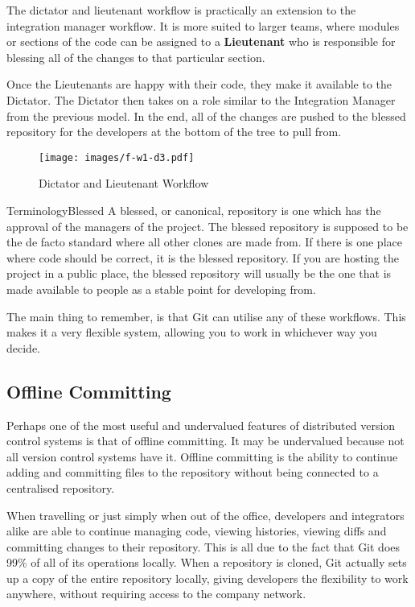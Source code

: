 The dictator and lieutenant workflow is practically an extension to the integration manager workflow.
It is more suited to larger teams, where modules or sections of the code can be assigned to a \textbf{Lieutenant} who is responsible for blessing all of the changes to that particular section.

Once the Lieutenants are happy with their code, they make it available to the Dictator.
The Dictator then takes on a role similar to the Integration Manager from the previous model.
In the end, all of the changes are pushed to the blessed repository for the developers at the bottom of the tree to pull from.

\begin{figure}[bt]
	\centering
	\texttt{[image: images/f-w1-d3.pdf]}
	\caption{Dictator and Lieutenant Workflow}
\end{figure}

\begin{callout}{Terminology}{Blessed}
A blessed, or canonical, repository is one which has the approval of the managers of the project.
The blessed repository is supposed to be the de facto standard where all other clones are made from.
If there is one place where code should be correct, it is the blessed repository.
If you are hosting the project in a public place, the blessed repository will usually be the one that is made available to people as a stable point for developing from.
\end{callout}

The main thing to remember, is that Git can utilise any of these workflows.
This makes it a very flexible system, allowing you to work in whichever way you decide.

\subsection{Offline Committing}

Perhaps one of the most useful and undervalued features of distributed version control systems is that of offline committing.
It may be undervalued because not all version control systems have it.
Offline committing is the ability to continue adding and committing files to the repository without being connected to a centralised repository.

When travelling or just simply when out of the office, developers and integrators alike are able to continue managing code, viewing histories, viewing diffs and committing changes to their repository.
This is all due to the fact that Git does 99\% of all of its operations locally.
When a repository is cloned, Git actually sets up a copy of the entire repository locally, giving developers the flexibility to work anywhere, without requiring access to the company network.

